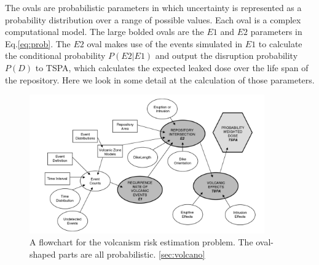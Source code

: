 \documentclass[nofootinbib,preprint,aps]{revtex4-1}
\begin{document}
        The ovals are probabilistic parameters in which uncertainty
        is represented as a probability distribution over a range of possible values.
        Each oval is a complex computational model.
        The large bolded ovals are the $E1$ and $E2$ parameters in Eq.\ref{eq:prob}.
        The $E2$ oval makes
        use of the events simulated in $E1$ to calculate the conditional probability $P(E2|E1)$ and output
        the disruption probability $P(D)$ to TSPA, which calculates the expected leaked dose over the
        life span of the repository. Here we look in some detail at the calculation of those parameters.
        \begin{figure}[h]
            \centering
            \includegraphics[width=0.9\textwidth]{volcano.png}
            \caption{A flowchart for the volcanism risk estimation problem. The oval-shaped
            parts are all probabilistic. \ref{sec:volcano} \cite{cv14}}
            \label{fig:volcanos}
        \end{figure}
\end{document}
